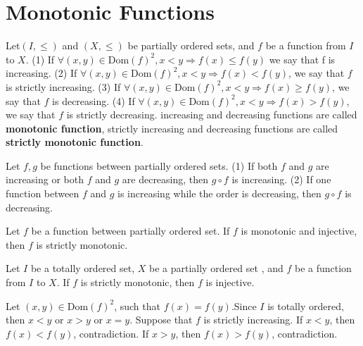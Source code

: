 \section{Monotonic Functions}
\begin{definitionenv}
    Let$(I, \le)$ and $(X, \le)$ be partially ordered sets, and $f$ be a function from $I$
 to $X$.
 \newline
 (1) If $\forall(x, y)\in \mathrm{Dom}(f)^2, x<y \Rightarrow f(x)\le f(y)$ we say that f is increasing.
 \newline
 (2) If $\forall (x, y)\in \mathrm{Dom}(f)^2, x<y \Rightarrow f(x)< f(y)$,  we say that $f$ is strictly increasing.
 \newline
  (3) If $\forall (x, y)\in \mathrm{Dom}(f)^2, x<y \Rightarrow f(x)\geq  f(y)$,  we say that $f$ is decreasing.
\newline
 (4) If $\forall (x, y)\in \mathrm{Dom}(f)^2, x<y \Rightarrow f(x)> f(y)$,  we say that $f$ is strictly decreasing.
 \newline
increasing and decreasing functions are called \textbf{monotonic function},  strictly increasing and decreasing functions are called \textbf{strictly monotonic function}.
\end{definitionenv}
\begin{propositionenv}
    Let $f, g$ be functions between partially ordered sets.
    \newline
    (1) If both $f$ and $g$ are increasing or both $f$ and $g$ are decreasing, then $g\circ f $ is increasing.
    \newline
    (2) If one function between $f$ and $g$ is increasing while the order is decreasing, then $g\circ f $ is decreasing.
\end{propositionenv}
\begin{propositionenv}
    Let $f$ be a function between partially ordered set. If $f$ is monotonic and injective,  then $f$ is strictly monotonic.
\end{propositionenv}
\begin{propositionenv}
    Let $I$ be a totally ordered set, $X$ be a partially ordered set , and $f$ be a function from $I$ to $X$. If $f$ is strictly monotonic,  then $f$ is injective.
\end{propositionenv}
\begin{proofenv}
    Let $(x, y)\in \mathrm{Dom}(f)^2$, such that $f(x)=f(y)$.Since $I$ is totally ordered,  then $x<y$ or $x>y$ or $x=y$. Suppose that $f$ is strictly increasing. If $x<y $, then $f(x)<f(y)$,  contradiction. If $x>y $, then $f(x)>f(y)$,  contradiction.
\end{proofenv}
